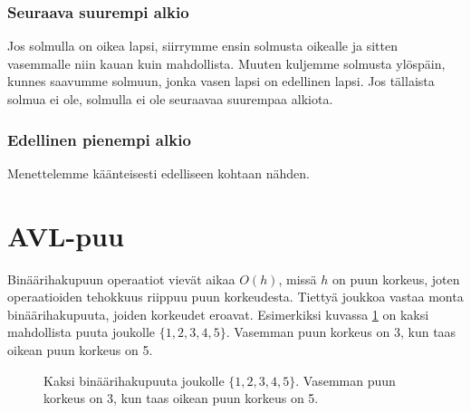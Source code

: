 \subsubsection{Seuraava suurempi alkio}

Jos solmulla on oikea lapsi, siirrymme ensin solmusta oikealle
ja sitten vasemmalle niin kauan kuin mahdollista.
Muuten kuljemme solmusta ylöspäin, kunnes saavumme solmuun,
jonka vasen lapsi on edellinen lapsi.
Jos tällaista solmua ei ole, solmulla ei ole seuraavaa
suurempaa alkiota.

\subsubsection{Edellinen pienempi alkio}

Menettelemme käänteisesti edelliseen kohtaan nähden.

\section{AVL-puu}

Binäärihakupuun operaatiot vievät aikaa $O(h)$,
missä $h$ on puun korkeus, joten operaatioiden tehokkuus
riippuu puun korkeudesta.
Tiettyä joukkoa vastaa monta binäärihakupuuta,
joiden korkeudet eroavat.
Esimerkiksi kuvassa \ref{fig:bihkor} on kaksi mahdollista puuta
joukolle $\{1,2,3,4,5\}$.
Vasemman puun korkeus on 3, kun taas oikean puun korkeus on 5.

\begin{figure}
\center
{}
\caption{Kaksi binäärihakupuuta joukolle $\{1,2,3,4,5\}$.
Vasemman puun korkeus on 3, kun taas oikean puun korkeus on 5.}
\label{fig:bihkor}
\end{figure}


